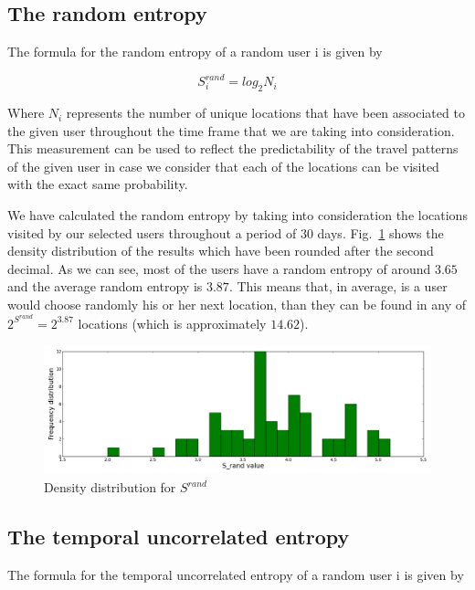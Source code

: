 \subsection{The random entropy}
\label{r_e}

The formula for the random entropy of a random user i is given by

\begin{equation}
S_{i}^{rand} = log_{2}N_{i}
\end{equation}

Where $N_{i}$ represents the number of unique locations that
have been associated to the given user throughout the time frame that we are
taking into consideration. This measurement can be used to reflect the
predictability of the travel patterns of the given user in case we consider that
each of the locations can be visited with the exact same probability.

We have calculated the random entropy by taking into consideration the locations
visited by our selected users throughout a period of $30$ days.
Fig.~\ref{dis_r_e} shows the density distribution of the results which have been
rounded after the second decimal. As we can see, most of the users have a random
entropy of around $3.65$ and the average random entropy is $3.87$. This means
that, in average, is a user would choose randomly his or her next location, than
they can be found in any of $2^{S^{rand}} = 2^{3.87}$ locations (which is
approximately $14.62$).

\begin{figure}[!h]
\centering
\includegraphics[width=\textwidth]{figures/entro_pred/rand_entro_distrib.png}
\caption{Density distribution for $S^{rand}$}
\label{dis_r_e}
\end{figure}

\subsection{The temporal uncorrelated entropy}
\label{tu_e}

The formula for the temporal uncorrelated entropy of a random user i is given by

